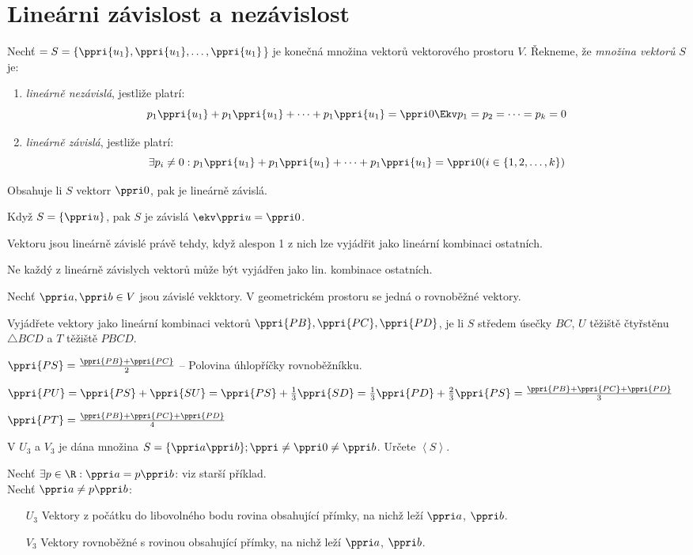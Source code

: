
\let\braceru=\relax \let\bracelu=\relax 
\def\o#1{\setbox0=
	\hbox{$\kern2pt\overbrace{\kern-2pt#1\kern-2pt}\kern2pt$}\ht0=2.1ex\box0}
\def\to#1{\hbox{#1\rlap{\t{}}}}
\def\rad{\rm{rad}}
\def\f{\frac}
\BeginDoc{}
\section{Lineárni závislost a nezávislost}
\Def Nechť $=S = \{ \ppri{u_1},\ppri{u_1},\dots,\ppri{u_1}$\} je konečná množina vektorů vektorového prostoru $V$.
Řekneme, že \emph{množina vektorů} $S$ je:
\begin{enumerate}
	\item \emph{lineárně nezávislá}, jestliže platrí:
		$$ p_1 \* \ppri{u_1} + p_1 \* \ppri{u_1} + \cdots + p_1 \* \ppri{u_1} = \ppri 0 \Ekv p_1=p_2=\cdots=p_k = 0$$
	\item \emph{lineárně závislá}, jestliže platrí:
		$$\exists p_i\neq 0:  p_1 \* \ppri{u_1} + p_1 \* \ppri{u_1} + \cdots + p_1 \* \ppri{u_1}  = \ppri 0 ( i \in \{ 1,2,\dots,k\} ) $$
\end{enumerate}

\V Obsahuje li $S$ vektorr $\ppri 0$, pak je lineárně závislá.

Když $S = \{ \ppri u \}$, pak $S$ je závislá $\ekv \ppri u = \ppri 0$.

\V Vektoru jsou lineárně závislé právě tehdy, když alespon 1 z nich lze vyjádřit jako lineární kombinaci ostatních.

\Poz Ne každý z lineárně závislych vektorů může být vyjádřen jako lin. kombinace ostatních.

\Poz Nechť $\ppri a,\ppri b \in V$ jsou závislé vekktory. V geometrickém prostoru se jedná o rovnoběžné vektory. 

\Pr 
Vyjádřete vektory jako lineární kombinaci vektorů $\ppri{PB},\ppri{PC},\ppri{PD}$, je li $S$ středem úsečky $BC$, $U$ těžiště čtyřstěnu $\triangle BCD$ a $T$  těžiště $PBCD$.

$\ppri{PS} = \f{\ppri{PB}+\ppri{PC}}2$ -- Polovina úhlopříčky rovnoběžníkku.

$\ppri {PU} = \ppri{PS} + \ppri{SU} = \ppri{PS} + \f 1 3 \ppri{SD} = \f 1 3 \ppri{PD} + \f 2 3 \ppri{PS} = \f{\ppri{PB}+\ppri{PC}+\ppri{PD}}3$

$\ppri{PT} = \f{\ppri{PB}+\ppri{PC}+\ppri{PD}} 4$

\Pr V $U_3$ a $V_3$ je dána množina $S=\{\ppri a\ppri b\}; \ppri \ne \ppri 0 \ne \ppri b$. 
Určete $\left<S\right>$.

Nechť $\exists p \in \R : \ppri a  = p \* \ppri b$: viz starší příklad.\\
Nechť $\ppri a \ne p \ppri b $:
\begin{enumerate}
	\item[$U_3$] Vektory z počátku do libovolného bodu rovina obsahující přímky, na nichž leží $\ppri a$, $\ppri b$.
	\item[$V_3$] Vektory rovnoběžné s rovinou obsahující přímky, na nichž leží $\ppri a$, $\ppri b$.
\end{enumerate}

\EndDoc

